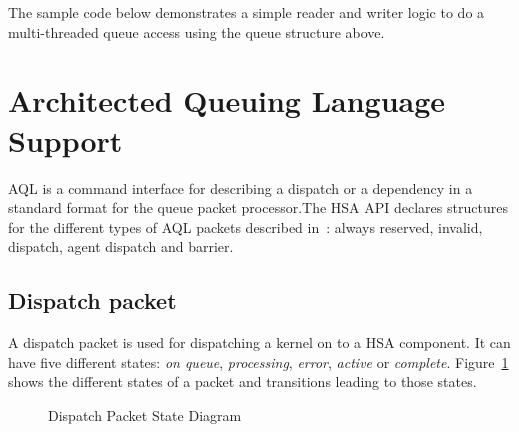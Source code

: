 \documentclass[draft]{book}
\begin{document}
The sample code below demonstrates a simple reader and writer logic to do a
multi-threaded queue access using the queue structure above.




\section{Architected Queuing Language Support}
\label{AQL}\hypertarget{AQL}{}
AQL is a command interface for describing a dispatch or a dependency in a
standard format for the queue packet processor.The HSA API declares structures
for the different types of AQL packets described in~\cite{sar}: always reserved,
invalid, dispatch, agent dispatch and barrier.

\hypertarget{dispatch-packet}{}\subsection{Dispatch packet}\label{dispatch-packet}

A dispatch packet is used for dispatching a kernel on to a HSA component. It can
have five different states: \emph{on queue}, \emph{processing}, \emph{error},
\emph{active} or \emph{complete}. Figure~\ref{fig:packetstate} shows the
different states of a packet and transitions leading to those states.

\begin{figure}[b]
  \centering
  \scriptsize
{}
  \centering
  \caption{Dispatch Packet State Diagram}
  \label{fig:packetstate}
\end{figure}
\end{document}
